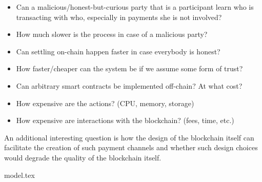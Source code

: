 \begin{itemize}
    \item Can a malicious/honest-but-curious party that is a participant learn who is
    transacting with who, especially in payments she is not involved?
    \item How much slower is the process in case of a malicious party?
    \item Can settling on-chain happen faster in case everybody is honest?
    \item How faster/cheaper can the system be if we assume some form of trust?
    \item Can arbitrary smart contracts be implemented off-chain? At what cost?
    \item How expensive are the actions? (CPU, memory, storage)
    \item How expensive are interactions with the blockchain? (fees, time, etc.)
  \end{itemize}

  An additional interesting question is how the design of the blockchain itself can
  facilitate the creation of such payment channels and whether such design choices would
  degrade the quality of the blockchain itself.

  {model.tex}
